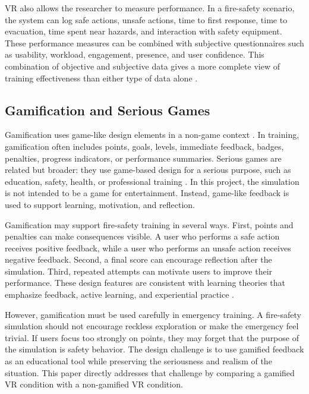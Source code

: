 \documentclass[manuscript, review]{acmart}
\begin{document}
{VR also allows the researcher to measure performance. In a fire-safety scenario, the system can log safe actions, unsafe actions, time to first response, time to evacuation, time spent near hazards, and interaction with safety equipment. These performance measures can be combined with subjective questionnaires such as usability, workload, engagement, presence, and user confidence. This combination of objective and subjective data gives a more complete view of training effectiveness than either type of data alone \cite{bikkina2025learnings,witmer1998measuring}.

\subsection{Gamification and Serious Games}

Gamification uses game-like design elements in a non-game context \cite{deterding2011gamification}. In training, gamification often includes points, goals, levels, immediate feedback, badges, penalties, progress indicators, or performance summaries. Serious games are related but broader: they use game-based design for a serious purpose, such as education, safety, health, or professional training \cite{abt1970serious,prensky2001digital,kapp2012gamification}. In this project, the simulation is not intended to be a game for entertainment. Instead, game-like feedback is used to support learning, motivation, and reflection.

Gamification may support fire-safety training in several ways. First, points and penalties can make consequences visible. A user who performs a safe action receives positive feedback, while a user who performs an unsafe action receives negative feedback. Second, a final score can encourage reflection after the simulation. Third, repeated attempts can motivate users to improve their performance. These design features are consistent with learning theories that emphasize feedback, active learning, and experiential practice \cite{kolb1984experiential,mayer2009multimedia,ryan2000self}.

However, gamification must be used carefully in emergency training. A fire-safety simulation should not encourage reckless exploration or make the emergency feel trivial. If users focus too strongly on points, they may forget that the purpose of the simulation is safety behavior. The design challenge is to use gamified feedback as an educational tool while preserving the seriousness and realism of the situation. This paper directly addresses that challenge by comparing a gamified VR condition with a non-gamified VR condition.

}
\end{document}
